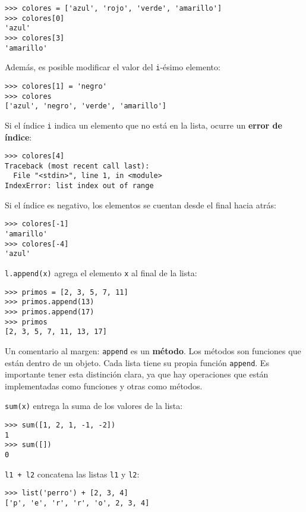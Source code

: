 \begin{lstlisting}
>>> colores = ['azul', 'rojo', 'verde', 'amarillo']
>>> colores[0]
'azul'
>>> colores[3]
'amarillo'
\end{lstlisting}

Además, es posible modificar el valor del \lstinline!i!-ésimo elemento:

\begin{lstlisting}
>>> colores[1] = 'negro'
>>> colores
['azul', 'negro', 'verde', 'amarillo']
\end{lstlisting}

Si el índice \lstinline!i! indica un elemento que no está en la lista,
ocurre un \textbf{error de índice}:

\begin{lstlisting}
>>> colores[4]
Traceback (most recent call last):
  File "<stdin>", line 1, in <module>
IndexError: list index out of range
\end{lstlisting}

Si el índice es negativo, los elementos se cuentan desde el final hacia
atrás:

\begin{lstlisting}
>>> colores[-1]
'amarillo'
>>> colores[-4]
'azul'
\end{lstlisting}

\lstinline!l.append(x)! agrega el elemento \lstinline!x! al final de la
lista:

\begin{lstlisting}
>>> primos = [2, 3, 5, 7, 11]
>>> primos.append(13)
>>> primos.append(17)
>>> primos
[2, 3, 5, 7, 11, 13, 17]
\end{lstlisting}

Un comentario al margen: \lstinline!append! es un \textbf{método}. Los
métodos son funciones que están dentro de un objeto. Cada lista tiene su
propia función \lstinline!append!. Es importante tener esta distinción
clara, ya que hay operaciones que están implementadas como funciones y
otras como métodos.

\lstinline!sum(x)! entrega la suma de los valores de la lista:

\begin{lstlisting}
>>> sum([1, 2, 1, -1, -2])
1
>>> sum([])
0
\end{lstlisting}

\lstinline!l1 + l2! concatena las listas \lstinline!l1! y
\lstinline!l2!:

\begin{lstlisting}
>>> list('perro') + [2, 3, 4]
['p', 'e', 'r', 'r', 'o', 2, 3, 4]
\end{lstlisting}

